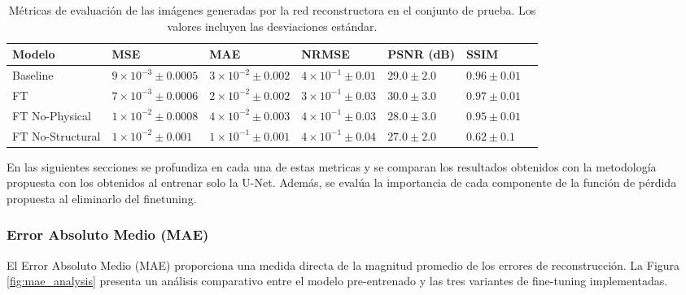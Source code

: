 \begin{table}[H]
    \centering
    \begin{tabularx}{\textwidth}{lXXXXXX}
    \hline
    \textbf{Modelo} & \textbf{MSE} & \textbf{MAE} & \textbf{NRMSE} & \textbf{PSNR} (dB) & \textbf{SSIM} \\
    \hline
    Baseline & $9\times10^{-3} \pm 0.0005$ & $3\times10^{-2} \pm 0.002$ & $4\times10^{-1} \pm 0.01$ & $29.0 \pm 2.0$ & $0.96 \pm 0.01$ \\
    FT & $7\times10^{-3} \pm 0.0006$ & $2\times10^{-2} \pm 0.002$ & $3\times10^{-1} \pm 0.03$ & $30.0 \pm 3.0$ & $0.97 \pm 0.01$ \\
    FT No-Physical & $1\times10^{-2} \pm 0.0008$ & $4\times10^{-2} \pm 0.003$ & $4\times10^{-1} \pm 0.03$ & $28.0 \pm 3.0$ & $0.95 \pm 0.01$ \\
    FT No-Structural & $1\times10^{-2} \pm 0.001$ & $1\times10^{-1} \pm 0.001$ & $4\times10^{-1} \pm 0.04$ & $27.0 \pm 2.0$ & $0.62 \pm 0.1$ \\
    \hline
    \end{tabularx}
    \caption{Métricas de evaluación de las imágenes generadas por la red reconstructora en el conjunto de prueba. Los valores incluyen las desviaciones estándar.}
    \label{tab:metricas}
\end{table}

En las siguientes secciones se profundiza en cada una de estas metricas y se comparan los resultados obtenidos con la metodología propuesta con los obtenidos al entrenar solo la U-Net. Además, se evalúa la importancia de cada componente de la función de pérdida propuesta al eliminarlo del finetuning.

\subsubsection{Error Absoluto Medio (MAE)}

El Error Absoluto Medio (MAE) proporciona una medida directa de la magnitud promedio de los errores de reconstrucción. La Figura \ref{fig:mae_analysis} presenta un análisis comparativo entre el modelo pre-entrenado y las tres variantes de fine-tuning implementadas.

